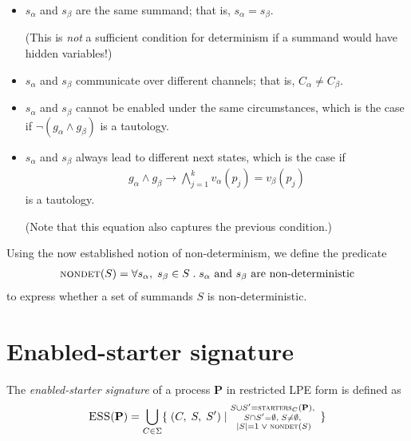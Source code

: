 \begin{itemize}
\item $s_\alpha$ and $s_\beta$ are the same summand; that is, $s_\alpha = s_\beta$.

(This is \emph{not} a sufficient condition for determinism if a summand would have hidden variables!)

\item $s_\alpha$ and $s_\beta$ communicate over different channels; that is, $C_\alpha \neq C_\beta$.

\item $s_\alpha$ and $s_\beta$ cannot be enabled under the same circumstances, which is the case if $\neg (g_\alpha \land g_\beta)$ is a tautology.

\item $s_\alpha$ and $s_\beta$ always lead to different next states, which is the case if
\begin{align*}
g_\alpha \land g_\beta \rightarrow \bigwedge\limits_{j=1}^{k} v_\alpha(p_j) = v_\beta(p_j)
\end{align*}
is a tautology.

(Note that this equation also captures the previous condition.)
\end{itemize}

Using the now established notion of non-determinism, we define the predicate
\begin{align*}
\textsc{nondet}(S) = \forall s_\alpha,\; s_\beta \in S \; .\; \text{$s_\alpha$ and $s_\beta$ are non-deterministic}
\end{align*}
to express whether a set of summands $S$ is non-deterministic.

\clearpage
\section{Enabled-starter signature} \label{enabled-starter-signature}

The \emph{enabled-starter signature} of a process $\mathbf{P}$ in restricted LPE form is defined as
\begin{align*}
\textsc{ESS}(\mathbf{P}) = \bigcup\limits_{C \in \Sigma} \{\;(C,\; S,\; {S}^\prime)\;|\;\substack{S \cup {S}^\prime = \textsc{starters}_{C}(\mathbf{P}),\;\\ S \cap {S}^\prime = \emptyset,\; S \neq \emptyset,\;\\ |S|=1 \;\lor\; \textsc{nondet}(S)}\;\}
\end{align*}

